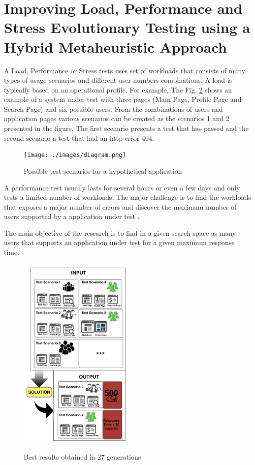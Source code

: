 \section{Improving Load, Performance and Stress Evolutionary Testing using a Hybrid Metaheuristic Approach}

A  Load, Performance or Stress tests uses set of workloads that consists of many types of usage scenarios and different user numbers combinations. A load is typically based on an operational profile. For example,  The Fig. \ref{fig:example} shows an example  of a system under test with three pages (Main Page, Profile Page and Search Page) and six possible users. From the combinations of users and application pages various scenarios can be created as the scenarios 1 and 2 presented in the figure. The first scenario presents a test that has passed and the second scenario a test that had an http error 404.

\begin{figure}[ht]
\centering
\caption{Possible test scenarios for a hypothetical application}
\texttt{[image: ./images/diagram.png]}
\label{fig:example}
\end{figure}


A performance test usually lasts for several hours or even a few days and only tests a limited number of workloads. The major challenge is to find the workloads  that exposes a major number of errors and discover the maximum number of users supported by a application under test \cite{Barna2011}. 


The main objective of the research is to find in a given search space as many users that supports an application under test for a given maximum response time.



\begin{figure}[ht]
\centering
\caption{Best results obtained in 27 generations}
\includegraphics[width=0.5\textwidth]{./images/solution.png}
\label{fig:example}
\end{figure}


